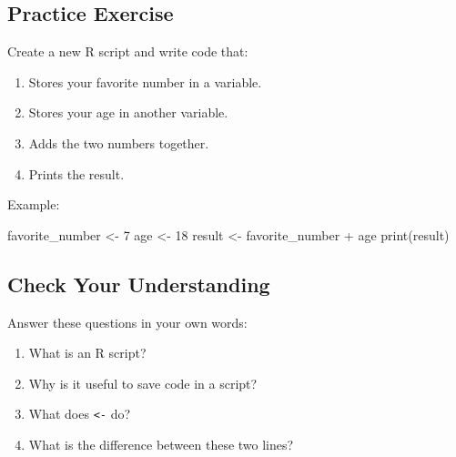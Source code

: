 \documentclass[
  letterpaper,
  DIV=11,
  numbers=noendperiod]{scrartcl}
\newenvironment{Shaded}{\begin{snugshade}}{\end{snugshade}}
\newcommand{\DecValTok}[1]{\textcolor[rgb]{0.68,0.00,0.00}{#1}}
\newcommand{\FunctionTok}[1]{\textcolor[rgb]{0.28,0.35,0.67}{#1}}
\newcommand{\NormalTok}[1]{\textcolor[rgb]{0.00,0.23,0.31}{#1}}
\newcommand{\OtherTok}[1]{\textcolor[rgb]{0.00,0.23,0.31}{#1}}
\newcommand{\SpecialCharTok}[1]{\textcolor[rgb]{0.37,0.37,0.37}{#1}}
\providecommand{\tightlist}{%
  \setlength{\itemsep}{0pt}\setlength{\parskip}{0pt}}
\begin{document}
\subsection{Practice Exercise}\label{practice-exercise}

\begin{tcolorbox}[enhanced jigsaw, arc=.35mm, bottomrule=.15mm, bottomtitle=1mm, breakable, colback=white, colbacktitle=quarto-callout-note-color!10!white, colframe=quarto-callout-note-color-frame, coltitle=black, left=2mm, leftrule=.75mm, opacityback=0, opacitybacktitle=0.6, rightrule=.15mm, title=\textcolor{quarto-callout-note-color}{\faInfo}\hspace{0.5em}{Practice}, titlerule=0mm, toprule=.15mm, toptitle=1mm]

Create a new R script and write code that:

\begin{enumerate}
\def\labelenumi{\arabic{enumi}.}
\tightlist
\item
  Stores your favorite number in a variable.
\item
  Stores your age in another variable.
\item
  Adds the two numbers together.
\item
  Prints the result.
\end{enumerate}

Example:

\begin{Shaded}
\begin{Highlighting}[]
\NormalTok{favorite\_number }\OtherTok{\textless{}{-}} \DecValTok{7}
\NormalTok{age }\OtherTok{\textless{}{-}} \DecValTok{18}
\NormalTok{result }\OtherTok{\textless{}{-}}\NormalTok{ favorite\_number }\SpecialCharTok{+}\NormalTok{ age}
\FunctionTok{print}\NormalTok{(result)}
\end{Highlighting}
\end{Shaded}

\end{tcolorbox}

\subsection{Check Your Understanding}\label{check-your-understanding}

Answer these questions in your own words:

\begin{enumerate}
\def\labelenumi{\arabic{enumi}.}
\tightlist
\item
  What is an R script?
\item
  Why is it useful to save code in a script?
\item
  What does \texttt{\textless{}-} do?
\item
  What is the difference between these two lines?
\end{enumerate}
\end{document}

